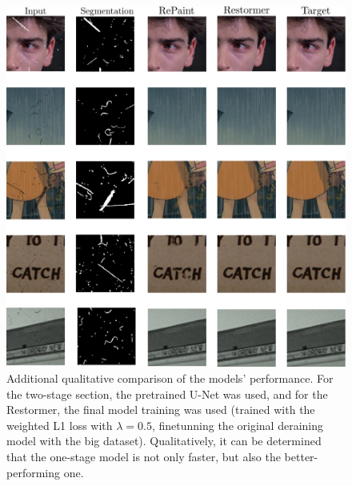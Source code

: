 \documentclass[10pt,a4paper,twocolumn,twoside]{article}
\begin{document}
\begin{figure}[h]
    \centering
    \includegraphics[width=0.8\linewidth]{img/AnnexA.pdf}
    \caption{Additional qualitative comparison of the models' performance. For the two-stage section, the pretrained U-Net was used, and for the Restormer, the final model training was used (trained with the weighted L1 loss with $\lambda = 0.5$, finetunning the original deraining model with the big dataset). Qualitatively, it can be determined that the one-stage model is not only faster, but also the better-performing one. }
    \label{fig:anex5}
\end{figure}
\end{document}
